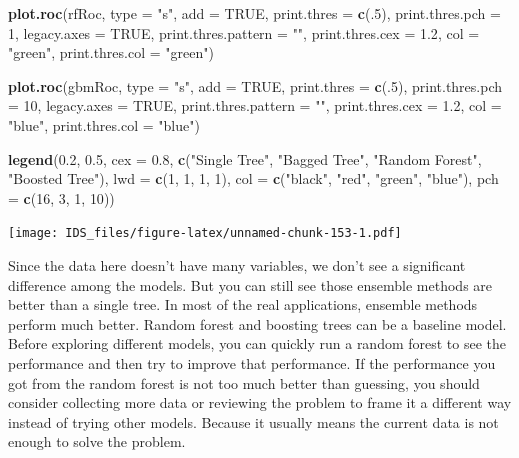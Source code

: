 \documentclass[12pt,]{krantz}
\makeatletter
\newenvironment{Shaded}{\begin{snugshade}}{\end{snugshade}}
\newcommand{\DataTypeTok}[1]{\textcolor[rgb]{0.27,0.27,0.27}{#1}}
\newcommand{\DecValTok}[1]{\textcolor[rgb]{0.06,0.06,0.06}{#1}}
\newcommand{\FloatTok}[1]{\textcolor[rgb]{0.06,0.06,0.06}{#1}}
\newcommand{\KeywordTok}[1]{\textcolor[rgb]{0.27,0.27,0.27}{\textbf{#1}}}
\newcommand{\NormalTok}[1]{#1}
\newcommand{\OtherTok}[1]{\textcolor[rgb]{0.37,0.37,0.37}{#1}}
\newcommand{\StringTok}[1]{\textcolor[rgb]{0.5,0.5,0.5}{#1}}
\newenvironment{kframe}{%
\medskip{}
\setlength{\fboxsep}{.8em}
 \def\at@end@of@kframe{}%
 \ifinner\ifhmode%
  \def\at@end@of@kframe{\end{minipage}}%
  \begin{minipage}{\columnwidth}%
 \fi\fi%
 \def\FrameCommand##1{\hskip\@totalleftmargin \hskip-\fboxsep
 \colorbox{shadecolor}{##1}\hskip-\fboxsep
     \hskip-\linewidth \hskip-\@totalleftmargin \hskip\columnwidth}%
 \MakeFramed {\advance\hsize-\width
   \@totalleftmargin\z@ \linewidth\hsize
   \@setminipage}}%
 {\par\unskip\endMakeFramed%
 \at@end@of@kframe}
\renewenvironment{Shaded}{\begin{kframe}}{\end{kframe}}
\makeatother
\begin{document}
\begin{Shaded}
\begin{Highlighting}[]
\KeywordTok{plot.roc}\NormalTok{(rfRoc, }
     \DataTypeTok{type =} \StringTok{"s"}\NormalTok{, }
     \DataTypeTok{add =} \OtherTok{TRUE}\NormalTok{, }
     \DataTypeTok{print.thres =} \KeywordTok{c}\NormalTok{(.}\DecValTok{5}\NormalTok{), }\DataTypeTok{print.thres.pch =} \DecValTok{1}\NormalTok{, }
     \DataTypeTok{legacy.axes =} \OtherTok{TRUE}\NormalTok{, }\DataTypeTok{print.thres.pattern =} \StringTok{""}\NormalTok{, }
     \DataTypeTok{print.thres.cex =} \FloatTok{1.2}\NormalTok{,}
     \DataTypeTok{col =} \StringTok{"green"}\NormalTok{, }\DataTypeTok{print.thres.col =} \StringTok{"green"}\NormalTok{)}

\KeywordTok{plot.roc}\NormalTok{(gbmRoc, }
     \DataTypeTok{type =} \StringTok{"s"}\NormalTok{, }
     \DataTypeTok{add =} \OtherTok{TRUE}\NormalTok{, }
     \DataTypeTok{print.thres =} \KeywordTok{c}\NormalTok{(.}\DecValTok{5}\NormalTok{), }\DataTypeTok{print.thres.pch =} \DecValTok{10}\NormalTok{, }
     \DataTypeTok{legacy.axes =} \OtherTok{TRUE}\NormalTok{, }\DataTypeTok{print.thres.pattern =} \StringTok{""}\NormalTok{, }
     \DataTypeTok{print.thres.cex =} \FloatTok{1.2}\NormalTok{,}
     \DataTypeTok{col =} \StringTok{"blue"}\NormalTok{, }\DataTypeTok{print.thres.col =} \StringTok{"blue"}\NormalTok{)}

\KeywordTok{legend}\NormalTok{(}\FloatTok{0.2}\NormalTok{, }\FloatTok{0.5}\NormalTok{, }\DataTypeTok{cex =} \FloatTok{0.8}\NormalTok{,}
       \KeywordTok{c}\NormalTok{(}\StringTok{"Single Tree"}\NormalTok{, }\StringTok{"Bagged Tree"}\NormalTok{, }
         \StringTok{"Random Forest"}\NormalTok{, }\StringTok{"Boosted Tree"}\NormalTok{),}
       \DataTypeTok{lwd =} \KeywordTok{c}\NormalTok{(}\DecValTok{1}\NormalTok{, }\DecValTok{1}\NormalTok{, }\DecValTok{1}\NormalTok{, }\DecValTok{1}\NormalTok{),}
       \DataTypeTok{col =} \KeywordTok{c}\NormalTok{(}\StringTok{"black"}\NormalTok{, }\StringTok{"red"}\NormalTok{, }\StringTok{"green"}\NormalTok{, }\StringTok{"blue"}\NormalTok{),}
       \DataTypeTok{pch =} \KeywordTok{c}\NormalTok{(}\DecValTok{16}\NormalTok{, }\DecValTok{3}\NormalTok{, }\DecValTok{1}\NormalTok{, }\DecValTok{10}\NormalTok{))}
\end{Highlighting}
\end{Shaded}

\texttt{[image: IDS\_files/figure-latex/unnamed-chunk-153-1.pdf]}

Since the data here doesn't have many variables, we don't see a significant difference among the models. But you can still see those ensemble methods are better than a single tree. In most of the real applications, ensemble methods perform much better. Random forest and boosting trees can be a baseline model. Before exploring different models, you can quickly run a random forest to see the performance and then try to improve that performance. If the performance you got from the random forest is not too much better than guessing, you should consider collecting more data or reviewing the problem to frame it a different way instead of trying other models. Because it usually means the current data is not enough to solve the problem.
\end{document}
